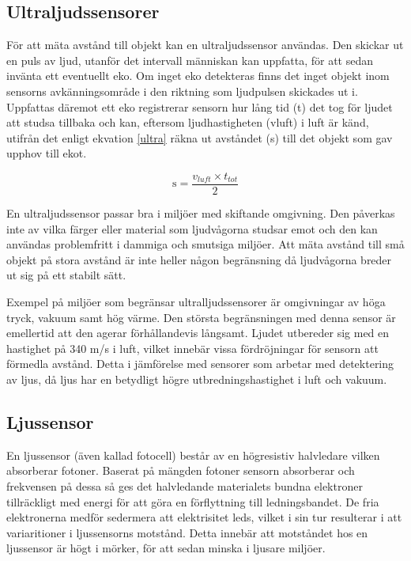 \documentclass[11pt]{article}
\begin{document}
\begin{flushleft}
\subsection{Ultraljudssensorer}
För att mäta avstånd till objekt kan en ultraljudssensor användas. Den skickar ut en puls av ljud, utanför det intervall människan kan uppfatta, för att sedan invänta ett eventuellt eko. Om inget eko detekteras finns det inget objekt inom sensorns avkänningsområde i den riktning som ljudpulsen skickades ut i. Uppfattas däremot ett eko registrerar sensorn hur lång tid (t) det tog för ljudet att studsa tillbaka och kan, eftersom ljudhastigheten (vluft) i luft är känd, utifrån det enligt ekvation \ref{ultra} räkna ut avståndet (s) till det objekt som gav upphov till ekot. \cite{Ultraljud}

\begin{equation}\label{ultra}
	\textrm{s} = \dfrac{v_{luft} \times t_{tot}}2				
\end{equation}

En ultraljudssensor passar bra i miljöer med skiftande omgivning. Den påverkas inte av vilka färger eller material som ljudvågorna studsar emot och den kan användas problemfritt i dammiga och smutsiga miljöer. Att mäta avstånd till små objekt på stora avstånd är inte heller någon begränsning då ljudvågorna breder ut sig på ett stabilt sätt. \cite{Ultraljud}

Exempel på miljöer som begränsar ultralljudssensorer är omgivningar av höga tryck, vakuum samt hög värme. Den största begränsningen med denna sensor är emellertid att den agerar förhållandevis långsamt. Ljudet utbereder sig med en hastighet på 340 m/s i luft, vilket innebär vissa fördröjningar för sensorn att förmedla avstånd. Detta i jämförelse med sensorer som arbetar med detektering av ljus, då ljus har en betydligt högre utbredningshastighet i luft och vakuum. \cite{Ultraljud}

\subsection{Ljussensor}
En ljussensor (även kallad fotocell) består av en högresistiv halvledare vilken absorberar fotoner. Baserat på mängden fotoner sensorn absorberar och frekvensen på dessa så ges det halvledande materialets bundna elektroner tillräckligt med energi för att göra en förflyttning till ledningsbandet. De fria elektronerna medför sedermera att elektrisitet leds,  vilket i sin tur resulterar i att variaritioner i ljussensorns motstånd. Detta innebär att motståndet hos en ljussensor är högt i mörker, för att sedan minska i ljusare miljöer. \cite{612896}


\end{flushleft}
\end{document}
